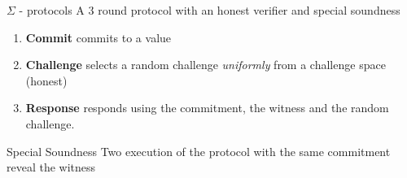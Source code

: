 \documentclass[handout]{beamer}
\begin{document}
\begin{frame}{$\Sigma$ - protocols}
A 3 round protocol with an honest verifier and special soundness \pause
\begin{enumerate}
	\item \textbf{Commit} \prv commits to a value
	\item \textbf{Challenge} \ver selects a random challenge \emph{uniformly} from a challenge space (honest) 
	\item \textbf{Response} \prv responds using the commitment, the witness and the random challenge.
\end{enumerate}
\pause
\begin{block}{Special Soundness}
Two execution of the protocol with the same commitment reveal the witness
\end{block}
\end{frame}
\end{document}
